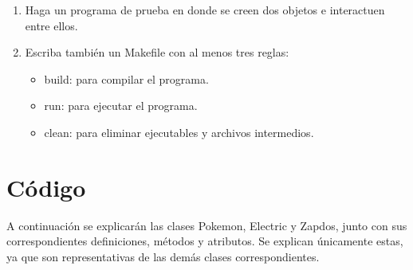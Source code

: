 \documentclass[11pt]{article}
\begin{document}
\begin{enumerate}
\begin{itemize}
\begin{itemize}
\end{itemize}
\end{itemize}
\item Haga un programa de prueba en donde se creen dos objetos e interactuen entre ellos.
\item Escriba tambi\'en un Makefile con al menos tres reglas:
\begin{itemize}
\item build: para compilar el programa.
\item run: para ejecutar el programa.
\item clean: para eliminar ejecutables y archivos intermedios.
\end{itemize}
\end{enumerate}

\section{C\'odigo}

A continuaci\'on se explicar\'an las clases Pokemon, Electric y Zapdos, junto con sus correspondientes definiciones, m\'etodos y atributos. Se explican \'unicamente estas, ya que son representativas de las dem\'as clases correspondientes.
\end{document}

